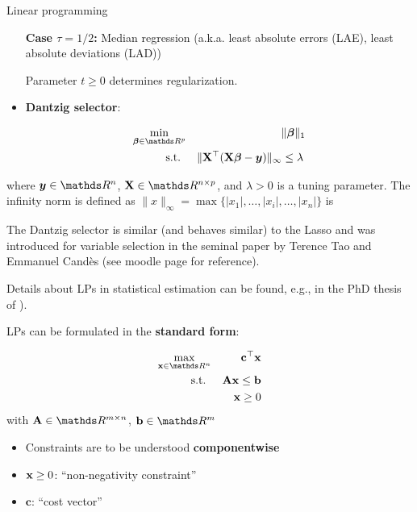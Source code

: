 \documentclass[11pt,compress,t,notes=noshow, xcolor=table]{beamer}
\begin{document}
\begin{vbframe}{Linear programming}
\begin{itemize}
\textbf{Case $\tau = 1/2$:} Median regression (a.k.a. least absolute errors (LAE), least absolute deviations (LAD))

\medskip

Parameter $t \geq 0$ determines regularization.

\item \textbf{Dantzig selector}:

\begin{eqnarray*}
\min_{\bm{\beta}\in \R^p} && \|\bm{\beta}\|_1 \\
\text{s.t. } && \| \Xmat^\top (\Xmat \bm{\beta} - \bm{y})\|_\infty \le \lambda \,
\end{eqnarray*}
\end{itemize}

where $\bm{y} \in \R^n$, $\Xmat \in \R^{n \times p}$, and $\lambda > 0$ is a tuning parameter. The infinity norm is defined as $\| x \|_\infty = \max\{|x_1|, \dots, |x_i|, \ldots, |x_n|\}$ is  

\lz

The Dantzig selector is similar (and behaves similar) to the Lasso and was introduced for variable selection in the seminal paper by Terence Tao and Emmanuel Cand\`es (see moodle page for reference).

\lz

Details about LPs in statistical estimation can be found, e.g., in the PhD thesis of \href{https://etd.ohiolink.edu/apexprod/rws_etd/send_file/send?accession=osu1222035715&disposition=inline}{}). 

\framebreak

LPs can be formulated in the \textbf{standard form}:

\vspace*{-0.5cm}

\begin{eqnarray*}
\max_{\xv \in \R^n} && \mathbf{c}^\top\xv\\
\text{s.t. } && \Amat\xv \le \mathbf{b} \\
&& \xv \ge 0
\end{eqnarray*}
with $\Amat \in \R^{m\times n}$, $\mathbf{b} \in \R^m$

\medskip

\begin{itemize}
    \item Constraints are to be understood \textbf{componentwise}
    \item $\mathbf{x} \ge 0$: \enquote{non-negativity constraint}
    \item $\mathbf{c}$: \enquote{cost vector}
\end{itemize}


\end{vbframe}
\end{document}
